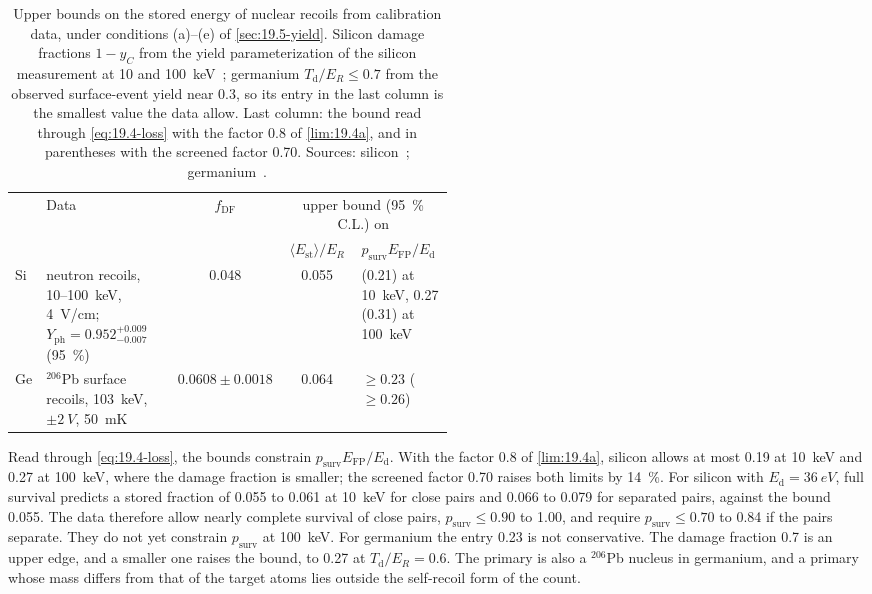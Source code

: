 \begin{table}[tbp]
\caption{Upper bounds on the stored energy of nuclear recoils from calibration data, under conditions (a)--(e) of \cref{sec:19.5-yield}. Silicon damage fractions $1 - y_C$ from the yield parameterization of the silicon measurement at 10 and \SI{100}{keV}~\cite[Eq.~(4)]{agnese2018nuclear}; germanium $T_{\mathrm{d}}/E_R \le 0.7$ from the observed surface-event yield near 0.3, so its entry in the last column is the smallest value the data allow. Last column: the bound read through \cref{eq:19.4-loss} with the factor 0.8 of \cref{lim:19.4a}, and in parentheses with the screened factor 0.70. Sources: silicon~\cite[Sects.~2 and 3.2]{agnese2018nuclear}; germanium~\cite[Table~II, Sect.~V\,A]{agnese2018energy}.}
\label{tab:19-bounds}
\centering\small\setlength{\tabcolsep}{4pt}
\begin{tabular}{l>{\raggedright\arraybackslash}p{0.30\linewidth}cc>{\raggedright\arraybackslash}p{0.21\linewidth}}
\toprule
 & Data & $f_{\mathrm{DF}}$ & \multicolumn{2}{c}{upper bound (\SI{95}{\percent} C.L.) on} \\
 & & & $\langle E_{\mathrm{st}}\rangle/E_R$ & $p_{\mathrm{surv}}E_{\mathrm{FP}}/E_{\mathrm{d}}$ \\
\midrule
Si & neutron recoils, 10--\SI{100}{keV}, \SI{4}{V/cm}; $Y_{\mathrm{ph}} = 0.952^{+0.009}_{-0.007}$ (\SI{95}{\percent}) & 0.048 & 0.055 & 0.19 (0.21) at \SI{10}{keV}, 0.27 (0.31) at \SI{100}{keV} \\
Ge & $^{206}$Pb surface recoils, \SI{103}{keV}, $\pm\SI{2}{V}$, \SI{50}{mK} & $0.0608 \pm 0.0018$ & 0.064 & $\ge 0.23$ ($\ge 0.26$) \\
\bottomrule
\end{tabular}
\end{table}

Read through \cref{eq:19.4-loss}, the bounds constrain $p_{\mathrm{surv}}E_{\mathrm{FP}}/E_{\mathrm{d}}$. With the factor 0.8 of \cref{lim:19.4a}, silicon allows at most 0.19 at \SI{10}{keV} and 0.27 at \SI{100}{keV}, where the damage fraction is smaller; the screened factor 0.70 raises both limits by \SI{14}{\percent}. For silicon with $E_{\mathrm{d}} = \SI{36}{eV}$, full survival predicts a stored fraction of 0.055 to 0.061 at \SI{10}{keV} for close pairs and 0.066 to 0.079 for separated pairs, against the bound 0.055. The data therefore allow nearly complete survival of close pairs, $p_{\mathrm{surv}} \le 0.90$ to 1.00, and require $p_{\mathrm{surv}} \le 0.70$ to 0.84 if the pairs separate. They do not yet constrain $p_{\mathrm{surv}}$ at \SI{100}{keV}. For germanium the entry 0.23 is not conservative. The damage fraction 0.7 is an upper edge, and a smaller one raises the bound, to 0.27 at $T_{\mathrm{d}}/E_R = 0.6$. The primary is also a $^{206}$Pb nucleus in germanium, and a primary whose mass differs from that of the target atoms lies outside the self-recoil form of the count.

